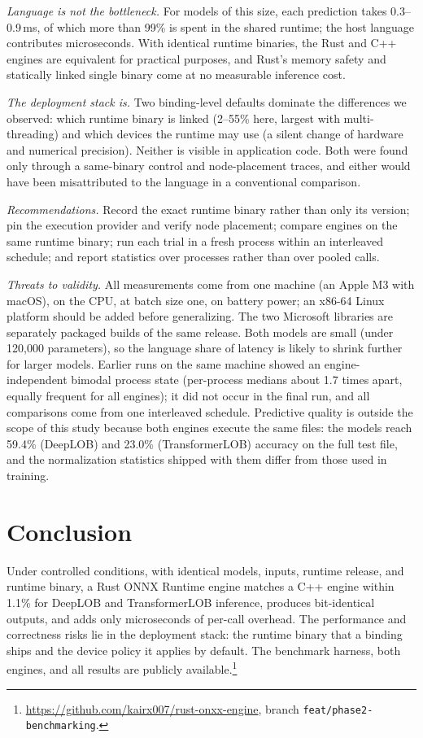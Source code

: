 \documentclass[conference]{IEEEtran}
\newcommand{\ms}{\,ms}
\begin{document}
\textit{Language is not the bottleneck.} For models of this size, each prediction takes 0.3--0.9\ms, of which more than 99\% is spent in the shared runtime; the host language contributes microseconds. With identical runtime binaries, the Rust and C++ engines are equivalent for practical purposes, and Rust's memory safety and statically linked single binary come at no measurable inference cost.

\textit{The deployment stack is.} Two binding-level defaults dominate the differences we observed: which runtime binary is linked (2--55\% here, largest with multi-threading) and which devices the runtime may use (a silent change of hardware and numerical precision). Neither is visible in application code. Both were found only through a same-binary control and node-placement traces, and either would have been misattributed to the language in a conventional comparison.

\textit{Recommendations.} Record the exact runtime binary rather than only its version; pin the execution provider and verify node placement; compare engines on the same runtime binary; run each trial in a fresh process within an interleaved schedule; and report statistics over processes rather than over pooled calls.

\textit{Threats to validity.} All measurements come from one machine (an Apple M3 with macOS), on the CPU, at batch size one, on battery power; an x86-64 Linux platform should be added before generalizing. The two Microsoft libraries are separately packaged builds of the same release. Both models are small (under 120,000 parameters), so the language share of latency is likely to shrink further for larger models. Earlier runs on the same machine showed an engine-independent bimodal process state (per-process medians about 1.7 times apart, equally frequent for all engines); it did not occur in the final run, and all comparisons come from one interleaved schedule. Predictive quality is outside the scope of this study because both engines execute the same files: the models reach 59.4\% (DeepLOB) and 23.0\% (TransformerLOB) accuracy on the full test file, and the normalization statistics shipped with them differ from those used in training.

\section{Conclusion}

Under controlled conditions, with identical models, inputs, runtime release, and runtime binary, a Rust ONNX Runtime engine matches a C++ engine within 1.1\% for DeepLOB and TransformerLOB inference, produces bit-identical outputs, and adds only microseconds of per-call overhead. The performance and correctness risks lie in the deployment stack: the runtime binary that a binding ships and the device policy it applies by default. The benchmark harness, both engines, and all results are publicly available.\footnote{\raggedright\url{https://github.com/kairx007/rust-onxx-engine}, branch \texttt{feat/phase2-benchmarking}.}
\end{document}
